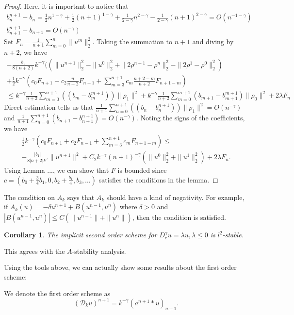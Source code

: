 \documentclass[11pt]{article} %
\newtheorem{cor}{Corollary}
\begin{document}
\begin{proof}
Here, it is important to notice that 
\begin{gather*}
b_n^{n+1}-b_n=\frac{1}{2}n^{1-\gamma}+\frac{1}{2}(n+1)^{1-\gamma}
+\frac{1}{2-\gamma}n^{2-\gamma}
-\frac{1}{2-\gamma}(n+1)^{2-\gamma}=O(n^{-1-\gamma})\\
b_{n+1}^{n+1}-b_{n+1}=O(n^{-\gamma})
\end{gather*}
Set $F_n=\frac{1}{n+1}\sum_{m=0}^n\|u^m\|_2^2$.
Taking the summation to $n+1$ and diving by $n+2$, we have
\begin{multline*}
-\frac{b_1}{8(n+2)}k^{-\gamma}((\|u^{n+1}\|_2^2-\|u^0\|_2^2+\|2\rho^{n+1}-\rho^n\|_2^2-\|2\rho^1-\rho^{0}\|_2^2)\\
+\frac{1}{2}k^{-\gamma}\left(c_0F_{n+1}
+c_2\frac{n}{n+2}F_{n-1}
+\sum_{m=3}^{n+1}c_m\frac{n+2-m}{n+2}F_{n+1-m}\right)\\
\le k^{-\gamma}\frac{1}{n+2}\sum_{m=0}^{n+1}((b_{m}-b^{m+1}_m))\|\rho_1\|^2
+k^{-\gamma}\frac{1}{n+2}\sum_{m=0}^{m+1}(b_{m+1}-b_{m+1}^{m+1})\|\rho_0\|^2
+2\lambda F_n
\end{multline*}
Direct estimation tells us that $\frac{1}{n+1}\sum_{n=0}^{n+1}((b_{n}-b^{n+1}_n))\|\rho_1\|^2=O(n^{-\gamma})$ and $\frac{1}{n+1}\sum_{n=0}^{n+1}(b_{n+1}-b_{n+1}^{n+1})=O(n^{-\gamma})$.
Noting the signs of the coefficients, we have
\begin{multline*}
\frac{1}{2}k^{-\gamma}\left(c_0F_{n+1}+c_2F_{n-1}
+\sum_{m=3}^{n+1}c_mF_{n+1-m}\right)\le \\
-\frac{|b_1|}{8|n+2|k^{\gamma}}\|u^{n+1}\|^2+
C_2k^{-\gamma}(n+1)^{-\gamma}(\|u^0\|_2^2+\|u^1\|_2^2)+2\lambda F_n.
\end{multline*}
Using Lemma ..., we can show that $F$ is bounded since $c=(b_0+\frac{3}{4}b_1,0, b_2+\frac{b_1}{4}, b_3,\ldots)$ satisfies the conditions in the lemma.
\end{proof}
The condition on $A_k$ says that $A_k$ should have a kind of negativity. For example, if $A_k(u)=-\delta u^{n+1}+B(u^{n-1}, u^n)$ where $\delta>0$ and $|B(u^{n-1}, u^n)|\le C(\|u^{n-1}\|+\|u^n\|)$, then the condition is satisfied. 

\begin{cor}
The implicit second order scheme for $D_c^{\gamma}u=\lambda u, \lambda\le 0$ is $l^2$-stable.
\end{cor}
This agrees with the $A$-stability analysis.


Using the tools above, we can actually show some results about the first order scheme:

We denote the first order scheme as $$
(\mathscr{D}_ku)^{n+1}=k^{-\gamma}(a^{n+1}*u)_{n+1}.
$$
\end{document}
